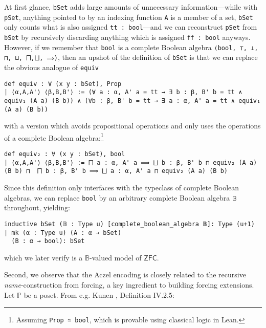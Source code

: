 \documentclass[sigplan,10pt,review, anonymous]{acmart}
\theoremstyle{definition}
\newcommand{\ZFC}{\mathsf{ZFC}}
\begin{document}
At first glance, \lstinline{bSet} adds large amounts of unnecessary information---while with \lstinline{pSet}, anything pointed to by an indexing function \lstinline{A} is a member of a set, \lstinline{bSet} only counts what is also assigned \lstinline{tt : bool}---and we can reconstruct \lstinline{pSet} from \lstinline{bSet} by recursively discarding anything which is assigned \lstinline{ff : bool} anyways. However, if we remember that \lstinline{bool} is a complete Boolean algebra \lstinline{⟨bool, ⊤, ⊥, ⊓, ⊔, ⨅,⨆, ⟹⟩}, then an upshot of the definition of \lstinline{bSet} is that we can replace the obvious analogue of \lstinline{equiv}
\begin{lstlisting}[breaklines, basicstyle=\ttfamily\small]
def equiv : ∀ (x y : bSet), Prop
| ⟨α,A,A'⟩ ⟨β,B,B'⟩ := (∀ a : α, A' a = tt → ∃ b : β, B' b = tt ∧ equiv₁ (A a) (B b)) ∧ (∀b : β, B' b = tt → ∃ a : α, A' a = tt ∧ equiv₁ (A a) (B b))
\end{lstlisting}
with a version which avoids propositional operations and only uses the operations of a complete Boolean algebra:\footnote{Assuming \lstinline{Prop ≃ bool}, which is provable using classical logic in Lean.}
\begin{lstlisting}[basicstyle=\ttfamily\small]
def equiv₂ : ∀ (x y : bSet), bool
| ⟨α,A,A'⟩ ⟨β,B,B'⟩ := ⨅ a : α, A' a ⟹ ⨆ b : β, B' b ⊓ equiv₂ (A a) (B b) ⊓  ⨅ b : β, B' b ⟹ ⨆ a : α, A' a ⊓ equiv₂ (A a) (B b)
\end{lstlisting}
Since this definition only interfaces with the typeclass of complete Boolean algebras, we can replace \lstinline{bool} by an arbitrary complete Boolean algebra \lstinline{𝔹} throughout, yielding: %
\begin{lstlisting}[breaklines, basicstyle=\ttfamily\small]
inductive bSet (𝔹 : Type u) [complete_boolean_algebra 𝔹]: Type (u+1)
| mk (α : Type u) (A : α → bSet)
  (B : α → bool): bSet
\end{lstlisting}
which we later verify is a \(\mathbb{B}\)-valued model of \(\ZFC\).

Second, we observe that the Aczel encoding is closely related to the recursive \emph{name}-construction from forcing, a key ingredient to building forcing extensions. Let \(\mathbb{P}\) be a poset. From e.g. Kunen \cite{kunen2014set}, Definition IV.2.5:

\end{document}
